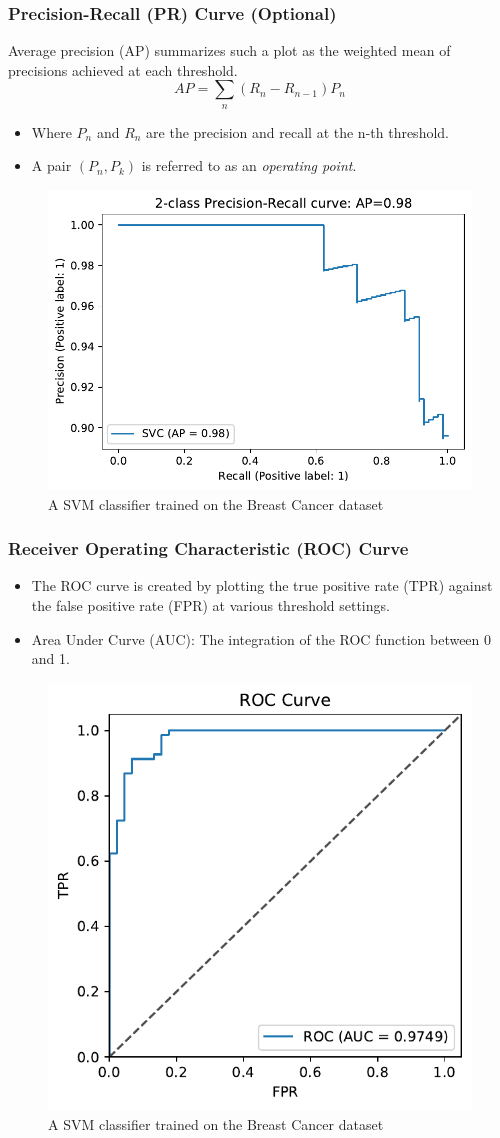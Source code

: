 \documentclass[aspectratio=169, 10pt]{beamer}
\begin{document}
\begin{frame}
    \frametitle{Precision-Recall (PR) Curve (Optional)}
    
    Average precision (AP) summarizes such a plot as the weighted mean of precisions achieved at each threshold.
    \[
        AP = \sum_{n}(R_n - R_{n-1})P_n
    \]

    \begin{itemize}
        \item Where $P_n$ and $R_n$ are the precision and recall at the n-th threshold.
        \item A pair $(P_n, P_k)$ is referred to as an \textit{operating point}.
    \end{itemize}
    
    \begin{figure}
        \centering
        \includegraphics[width=0.35\columnwidth]{../plots/pr_curve.pdf}
        \caption{A SVM classifier trained on the Breast Cancer dataset}
    \end{figure}
\end{frame}

\begin{frame}
    \frametitle{Receiver Operating Characteristic (ROC) Curve}
    
    \begin{itemize}
        \item The ROC curve is created by plotting the true positive rate (TPR) against the false positive rate (FPR) at various threshold settings.
        \item Area Under Curve (AUC): The integration of the ROC function between 0 and 1.
    \end{itemize}
    
    \begin{figure}
        \centering
        \includegraphics[width=0.3\columnwidth]{../plots/roc_curve.pdf}
        \caption{A SVM classifier trained on the Breast Cancer dataset}
    \end{figure}

\end{frame}
\end{document}
